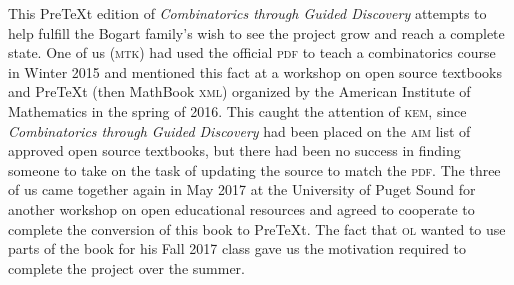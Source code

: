\documentclass[10pt,]{book}
\newcommand{\initialism}[1]{\textsc{\MakeLowercase{#1}}}
\theoremstyle{plain}
\theoremstyle{definition}
\theoremstyle{definition}
\numberwithin{equation}{chapter}
\begin{document}
\par
\hypertarget{p-23}{}%
This PreTeXt edition of \textsl{Combinatorics through Guided Discovery} attempts to help fulfill the Bogart family's wish to see the project grow and reach a complete state. One of us (\initialism{MTK}) had used the official \initialism{PDF} to teach a combinatorics course in Winter 2015 and mentioned this fact at a workshop on open source textbooks and PreTeXt (then MathBook \initialism{XML}) organized by the American Institute of Mathematics in the spring of 2016. This caught the attention of \initialism{KEM}, since \textsl{Combinatorics through Guided Discovery} had been placed on the \initialism{AIM} list of approved open source textbooks, but there had been no success in finding someone to take on the task of updating the source to match the \initialism{PDF}. The three of us came together again in May 2017 at the University of Puget Sound for another workshop on open educational resources and agreed to cooperate to complete the conversion of this book to PreTeXt. The fact that \initialism{OL} wanted to use parts of the book for his Fall 2017 class gave us the motivation required to complete the project over the summer.%
\par
\hypertarget{p-24}{}%
\end{document}
